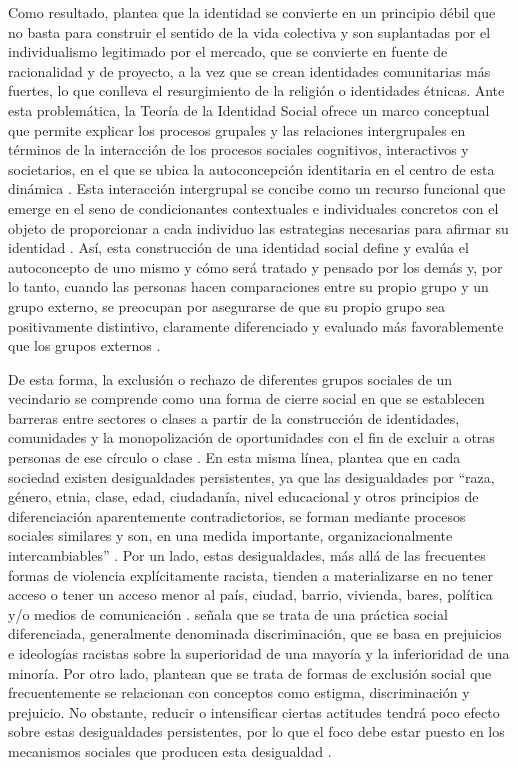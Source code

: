 \documentclass[12pt,twoside]{templates/facsothesis}
\begin{document}
Como resultado, \citet{castells_globalizacion_2005} plantea que la identidad se convierte en un principio débil que no basta para construir el sentido de la vida colectiva y son suplantadas por el individualismo legitimado por el mercado, que se convierte en fuente de racionalidad y de proyecto, a la vez que se crean identidades comunitarias más fuertes, lo que conlleva el resurgimiento de la religión o identidades étnicas. Ante esta problemática, la Teoría de la Identidad Social ofrece un marco conceptual que permite explicar los procesos grupales y las relaciones intergrupales en términos de la interacción de los procesos sociales cognitivos, interactivos y societarios, en el que se ubica la autoconcepción identitaria en el centro de esta dinámica \citep{hogg_social_2016}. Esta interacción intergrupal se concibe como un recurso funcional que emerge en el seno de condicionantes contextuales e individuales concretos con el objeto de proporcionar a cada individuo las estrategias necesarias para afirmar su identidad \citep{scandroglio_teoria_2008}. Así, esta construcción de una identidad social define y evalúa el autoconcepto de uno mismo y cómo será tratado y pensado por los demás y, por lo tanto, cuando las personas hacen comparaciones entre su propio grupo y un grupo externo, se preocupan por asegurarse de que su propio grupo sea positivamente distintivo, claramente diferenciado y evaluado más favorablemente que los grupos externos \citep{hogg_social_2016}.

De esta forma, la exclusión o rechazo de diferentes grupos sociales de un vecindario se comprende como una forma de cierre social en que se establecen barreras entre sectores o clases a partir de la construcción de identidades, comunidades y la monopolización de oportunidades con el fin de excluir a otras personas de ese círculo o clase \citep{parkin_Marxismo_1984}. En esta misma línea, \citet{tilly_desigualdad_2000} plantea que en cada sociedad existen desigualdades persistentes, ya que las desigualdades por ``raza, género, etnia, clase, edad, ciudadanía, nivel educacional y otros principios de diferenciación aparentemente contradictorios, se forman mediante procesos sociales similares y son, en una medida importante, organizacionalmente intercambiables'' \citep[p.~23]{tilly_desigualdad_2000}. Por un lado, estas desigualdades, más allá de las frecuentes formas de violencia explícitamente racista, tienden a materializarse en no tener acceso o tener un acceso menor al país, ciudad, barrio, vivienda, bares, política y/o medios de comunicación \citep{vandijk_Racismo_2013}. \citet{vandijk_Racismo_2013} señala que se trata de una práctica social diferenciada, generalmente denominada discriminación, que se basa en prejuicios e ideologías racistas sobre la superioridad de una mayoría y la inferioridad de una minoría. Por otro lado, \citet{diez-nicolas_Exclusion_2019} plantean que se trata de formas de exclusión social que frecuentemente se relacionan con conceptos como estigma, discriminación y prejuicio. No obstante, reducir o intensificar ciertas actitudes tendrá poco efecto sobre estas desigualdades persistentes, por lo que el foco debe estar puesto en los mecanismos sociales que producen esta desigualdad \citep{tilly_desigualdad_2000}.
\end{document}
